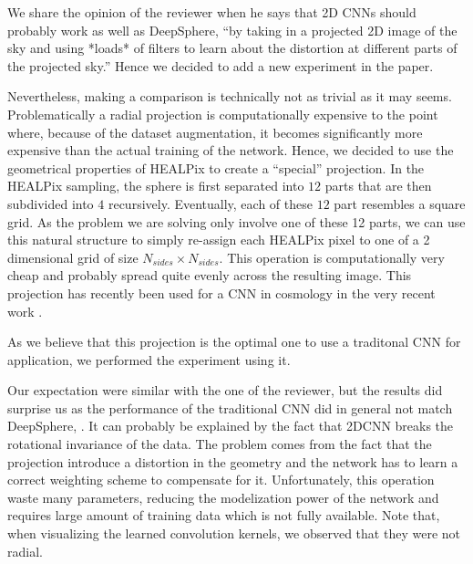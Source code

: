 \documentclass[12pt,a4paper]{article}
\newcommand{\nati}[1]{{\color[rgb]{.1,.6,.1}{NP: #1}}}
\newcommand{\TK}[1]{{\color{red}{TK: #1}}}
\newcommand{\todo}[1]{{\color[rgb]{.6,.1,.6}{TODO: #1}}}
\newcommand{\1}{\b{1}}              %
\newcommand{\0}{\b{0}}              %
\begin{document}
\todo{Assigned: @Nati, @Michael, @Tomek}
\nati{Please check if you like what I did in light of the discussion we had.}

We share the opinion of the reviewer when he says that 2D CNNs should probably work as well as DeepSphere, ``by taking in a projected 2D image of the sky and using *loads* of filters to learn about the distortion at different parts of the projected sky.'' Hence we decided to add a new experiment in the paper.

Nevertheless, making a comparison is technically not as trivial as it may seems.
Problematically a radial projection is computationally expensive to the point where, because of the dataset augmentation, it becomes significantly more expensive than the actual training of the network.
Hence, we decided to use the geometrical properties of HEALPix to create a ``special'' projection.
In the HEALPix sampling, the sphere is first separated into $12$ parts that are then subdivided into $4$ recursively.
Eventually, each of these $12$ part resembles a square grid.
As the problem we are solving only involve one of these 12 parts, we can use this natural structure to simply re-assign each HEALPix pixel to one of a 2 dimensional grid of size $N_{sides} \times N_{sides}$.
This operation is computationally very cheap and probably spread quite evenly across the resulting image.
This projection has recently been used for a CNN in cosmology in the very recent work \cite{krachmalnicoff2019convolutional}.

As we believe that this projection is the optimal one to use a traditonal CNN for application, we performed the experiment using it.

Our expectation were similar with the one of the reviewer, but the results did surprise us as the performance of the traditional CNN did in general not match DeepSphere, \nati{(see Figure 9 of the manuscript)}.
It can probably be explained by the fact that 2DCNN breaks the rotational invariance of the data.
The problem comes from the fact that the projection introduce a distortion in the geometry and the network has to learn a correct weighting scheme to compensate for it.
Unfortunately, this operation waste many parameters, reducing the modelization power of the network and requires large amount of training data which is not fully available.
Note that, when visualizing the learned convolution kernels, we observed that they were not radial.



\end{document}
